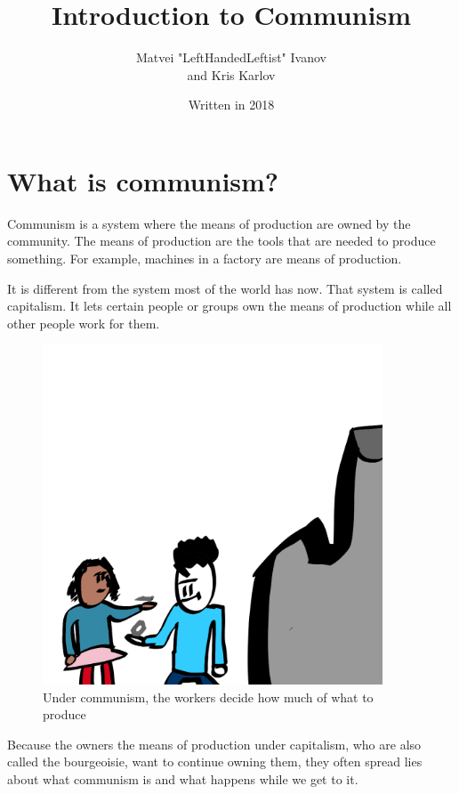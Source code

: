 \documentclass[a4paper]{book}%
\begin{document}
\fontsize{24}{28}\selectfont
\title{Introduction to Communism}
\author{Matvei "LeftHandedLeftist" Ivanov \\ and Kris Karlov}
\date{Written in 2018}
\maketitle
\fontsize{24}{28}\selectfont
\chapter{What is communism?}
Communism is a system where the means of production are owned by the community. The means of production are the tools that are needed to produce something. For example, machines in a factory are means of production.

It is different from the system most of the world has now. That system is called capitalism. It lets certain people or groups own the means of production while all other people work for them.

\begin{figure}[tbhp]
\centering
\includegraphics[width=0.9\textwidth]{1-1.png}
\caption{Under communism, the workers decide how much of what to produce}
\end{figure}

Because the owners the means of production under capitalism, who are also called the bourgeoisie, want to continue owning them, they often spread lies about what communism is and what happens while we get to it.
\end{document}
